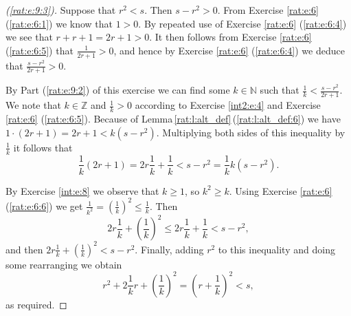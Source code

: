 \begin{proof}[(\ref{rat:e:9:3})]
	Suppose that $r^2 < s$. Then $s - r^2 > 0$. From Exercise \ref{rat:e:6} (\ref{rat:e:6:1}) we know that $1 > 0$. By repeated use of Exercise \ref{rat:e:6} (\ref{rat:e:6:4}) we see that $r + r + 1 = 2r + 1 > 0$. It then follows from Exercise \ref{rat:e:6} (\ref{rat:e:6:5}) that $\frac{1}{2r + 1} > 0$, and hence by Exercise \ref{rat:e:6} (\ref{rat:e:6:4}) we deduce that $\frac{s - r^2}{2r + 1} > 0$.

	By Part (\ref{rat:e:9:2}) of this exercise we can find some $k \in \mathbb{N}$ such that $\frac{1}{k} < \frac{s - r^2}{2r + 1}$. We note that $k \in \mathbb{Z}$ and $\frac{1}{k} > 0$ according to Exercise \ref{int2:e:4} and Exercise \ref{rat:e:6} (\ref{rat:e:6:5}). Because of Lemma\,\ref{rat:l:alt_def}\,(\ref{rat:l:alt_def:6}) we have $1 \cdot (2r + 1) = 2r + 1 < k(s - r^2)$. Multiplying both sides of this inequality by $\frac{1}{k}$ it follows that
	$$
		\frac{1}{k}(2r + 1) = 2r \frac{1}{k} + \frac{1}{k} < s - r^2 = \frac{1}{k} k (s - r^2).
	$$

	By Exercise \ref{int:e:8} we observe that $k \geq 1$, so $k^2 \geq k$. Using Exercise \ref{rat:e:6} (\ref{rat:e:6:6}) we get $\frac{1}{k^2} = \left( \frac{1}{k} \right)^2 \leq \frac{1}{k}$. Then
	$$
		2r \frac{1}{k} + \left( \frac{1}{k} \right)^2 \leq 2r \frac{1}{k} + \frac{1}{k} < s - r^2,
	$$
	and then $2r \frac{1}{k} + \left( \frac{1}{k} \right)^2 < s - r^2$. Finally, adding $r^2$ to this inequality and doing some rearranging we obtain
	$$
		r^2 + 2 \frac{1}{k} r + \left( \frac{1}{k} \right)^2 = \left( r + \frac{1}{k} \right)^2 < s,
	$$
	as required.
\end{proof}